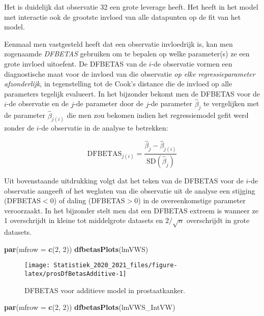 \documentclass[
  12pt,dutch,coursenotes]{book}
\newenvironment{Shaded}{\begin{snugshade}}{\end{snugshade}}
\newcommand{\DataTypeTok}[1]{\textcolor[rgb]{0.13,0.29,0.53}{#1}}
\newcommand{\DecValTok}[1]{\textcolor[rgb]{0.00,0.00,0.81}{#1}}
\newcommand{\KeywordTok}[1]{\textcolor[rgb]{0.13,0.29,0.53}{\textbf{#1}}}
\newcommand{\NormalTok}[1]{#1}
\theoremstyle{definition}
\theoremstyle{definition}
\theoremstyle{definition}
\theoremstyle{remark}
\begin{document}
Het is duidelijk dat observatie 32 een grote leverage heeft. Het heeft in het model met interactie ook de grootste invloed van alle datapunten op de fit van het model.

Eenmaal men vastgesteld heeft dat een observatie invloedrijk is, kan men zogenaamde \emph{DFBETAS} gebruiken om te bepalen op welke parameter(s) ze een grote invloed uitoefent. De DFBETAS van de \(i\)-de observatie vormen een diagnostische maat voor de invloed van die observatie \emph{op elke regressieparameter afzonderlijk}, in tegenstelling tot de Cook's distance die de invloed op alle parameters tegelijk evalueert. In het bijzonder bekomt men de DFBETAS voor de \(i\)-de observatie en de \(j\)-de parameter door de \(j\)-de parameter \(\hat{\beta}_j\) te vergelijken met de parameter \(\hat{\beta}_{j(i)}\) die men zou bekomen indien het regressiemodel gefit werd zonder de \(i\)-de observatie in de analyse te betrekken:

\[\textrm{DFBETAS}_{j(i)}=\frac{\hat{\beta}_{j}-\hat{\beta}_{j(i)}}{\textrm{SD}(\hat{\beta}_{j})}\]

Uit bovenstaande uitdrukking volgt dat het teken van de DFBETAS voor de \(i\)-de observatie aangeeft of het weglaten van die observatie uit de analyse een stijging (DFBETAS\(<0\)) of daling (DFBETAS\(>0\)) in de overeenkomstige parameter veroorzaakt. In het bijzonder stelt men dat een DFBETAS extreem is wanneer ze 1 overschrijdt in kleine tot middelgrote datasets en \(2/\sqrt{n}\) overschrijdt in grote datasets.

\begin{Shaded}
\begin{Highlighting}[]
\KeywordTok{par}\NormalTok{(}\DataTypeTok{mfrow =} \KeywordTok{c}\NormalTok{(}\DecValTok{2}\NormalTok{, }\DecValTok{2}\NormalTok{))}
\KeywordTok{dfbetasPlots}\NormalTok{(lmVWS)}
\end{Highlighting}
\end{Shaded}

\begin{figure}

{\centering \texttt{[image: Statistiek\_2020\_2021\_files/figure-latex/prosDfBetasAdditive-1]} 

}

\caption{DFBETAS voor additieve model in prostaatkanker.}\label{fig:prosDfBetasAdditive}
\end{figure}

\begin{Shaded}
\begin{Highlighting}[]
\KeywordTok{par}\NormalTok{(}\DataTypeTok{mfrow =} \KeywordTok{c}\NormalTok{(}\DecValTok{2}\NormalTok{, }\DecValTok{2}\NormalTok{))}
\KeywordTok{dfbetasPlots}\NormalTok{(lmVWS\_IntVW)}
\end{Highlighting}
\end{Shaded}
\end{document}
